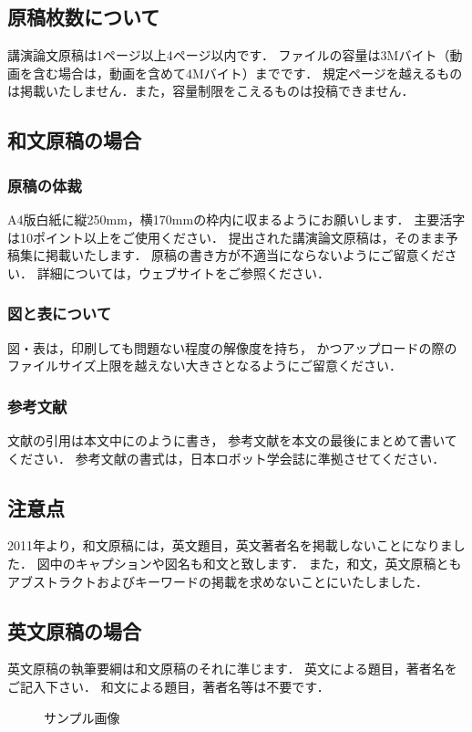 \documentclass[a4paper]{jarticle}  %
\begin{document}
\subsection{原稿枚数について}
講演論文原稿は1ページ以上4ページ以内です．
ファイルの容量は3Mバイト（動画を含む場合は，動画を含めて4Mバイト）までです．
規定ページを越えるものは掲載いたしません．また，容量制限をこえるものは投稿できません．

\subsection{和文原稿の場合}
\subsubsection{原稿の体裁}
A4版白紙に縦250mm，横170mmの枠内に収まるようにお願いします．
主要活字は10ポイント以上をご使用ください．
提出された講演論文原稿は，そのまま予稿集に掲載いたします．
原稿の書き方が不適当にならないようにご留意ください．
詳細については，ウェブサイト\cite{website}をご参照ください．
\subsubsection{図と表について}
図・表は，印刷しても問題ない程度の解像度を持ち，
かつアップロードの際のファイルサイズ上限を越えない大きさとなるようにご留意ください．
\subsubsection{参考文献}
文献の引用は本文中に\cite{yamada2000}のように書き，
参考文献を本文の最後にまとめて書いてください．
参考文献の書式は，日本ロボット学会誌に準拠させてください．

\subsection{注意点}
2011年より，和文原稿には，英文題目，英文著者名を掲載しないことになりました．
図中のキャプションや図名も和文と致します．
また，和文，英文原稿ともアブストラクトおよびキーワードの掲載を求めないことにいたしました．

\subsection{英文原稿の場合}
英文原稿の執筆要綱は和文原稿のそれに準じます．
英文による題目，著者名をご記入下さい．
和文による題目，著者名等は不要です．

\begin{figure}[tb]
      \centering
      \caption{サンプル画像}
      \label{fig:sample}
\end{figure}
\end{document}
